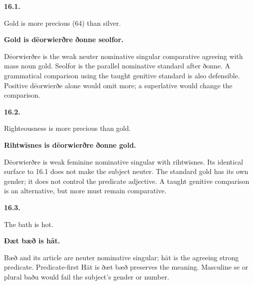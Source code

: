 \par\begin{minipage}{\linewidth}\raggedright
\textbf{16.1.}

Gold is more precious (64) than silver.

\textbf{Gold is dēorwierðre ðonne seolfor.}

Dēorwierðre is the weak neuter nominative singular comparative agreeing with mass noun gold. Seolfor is the parallel nominative standard after ðonne. A grammatical comparison using the taught genitive standard is also defensible. Positive dēorwierðe alone would omit more; a superlative would change the comparison.

\end{minipage}\par\addvspace{4pt}

\par\begin{minipage}{\linewidth}\raggedright
\textbf{16.2.}

Righteousness is more precious than gold.

\textbf{Rihtwīsnes is dēorwierðre ðonne gold.}

Dēorwierðre is weak feminine nominative singular with rihtwīsnes. Its identical surface to 16.1 does not make the subject neuter. The standard gold has its own gender; it does not control the predicate adjective. A taught genitive comparison is an alternative, but more must remain comparative.

\end{minipage}\par\addvspace{4pt}

\par\begin{minipage}{\linewidth}\raggedright
\textbf{16.3.}

The bath is hot.

\textbf{Ðæt bæð is hāt.}

Bæð and its article are neuter nominative singular; hāt is the agreeing strong predicate. Predicate-first Hāt is ðæt bæð preserves the meaning. Masculine se or plural baðu would fail the subject's gender or number.

\end{minipage}\par\addvspace{4pt}

